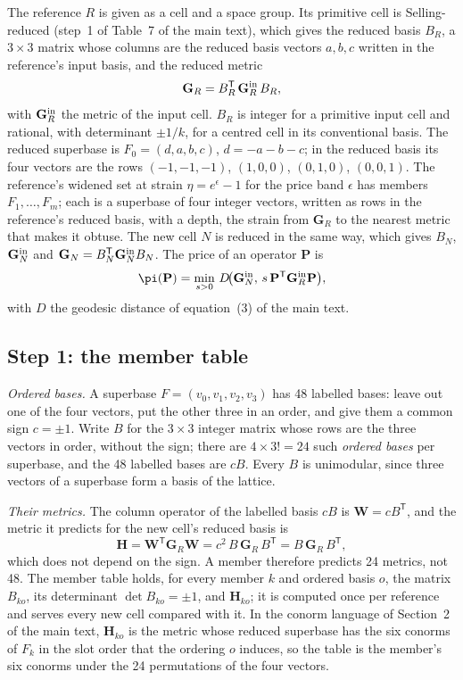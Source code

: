 \documentclass[preprint,pdf]{iucr}          %
\newcommand{\Gmet}{\mathbf{G}}
\newcommand{\Pop}{\mathbf{P}}
\newcommand{\Wop}{\mathbf{W}}
\newcommand{\dist}{D}
\begin{document}
The reference $R$ is given as a cell and a space group. Its primitive cell is Selling-reduced (step~1 of Table~7 of the main text), which gives the reduced basis $B_R$, a $3\times3$ matrix whose columns are the reduced basis vectors $a,b,c$ written in the reference's input basis, and the reduced metric
\begin{equation}
\Gmet_R=B_R^{\mathsf T}\,\Gmet_R^{\rm in}\,B_R ,
\end{equation}
with $\Gmet_R^{\rm in}$ the metric of the input cell. $B_R$ is integer for a primitive input cell and rational, with determinant $\pm1/k$, for a centred cell in its conventional basis. The reduced superbase is $F_0=(d,a,b,c)$, $d=-a-b-c$; in the reduced basis its four vectors are the rows $(-1,-1,-1)$, $(1,0,0)$, $(0,1,0)$, $(0,0,1)$. The reference's widened set at strain $\eta=e^\epsilon-1$ for the price band $\epsilon$ has members $F_1,\dots,F_m$; each is a superbase of four integer vectors, written as rows in the reference's reduced basis, with a depth, the strain from $\Gmet_R$ to the nearest metric that makes it obtuse. The new cell $N$ is reduced in the same way, which gives $B_N$, $\Gmet_N^{\rm in}$ and $\Gmet_N=B_N^{\mathsf T}\Gmet_N^{\rm in}B_N$. The price of an operator $\Pop$ is
\begin{equation}
\pi(\Pop)=\min_{s>0}\,\dist\!\bigl(\Gmet_N^{\rm in},\,s\,\Pop^{\mathsf T}\Gmet_R^{\rm in}\Pop\bigr),
\label{eq:wf-price}
\end{equation}
with $\dist$ the geodesic distance of equation~(3) of the main text.

\subsection{Step 1: the member table}

\emph{Ordered bases.} A superbase $F=(v_0,v_1,v_2,v_3)$ has 48 labelled bases: leave out one of the four vectors, put the other three in an order, and give them a common sign $c=\pm1$. Write $B$ for the $3\times3$ integer matrix whose rows are the three vectors in order, without the sign; there are $4\times3!=24$ such \emph{ordered bases} per superbase, and the 48 labelled bases are $cB$. Every $B$ is unimodular, since three vectors of a superbase form a basis of the lattice.

\emph{Their metrics.} The column operator of the labelled basis $cB$ is $\Wop=cB^{\mathsf T}$, and the metric it predicts for the new cell's reduced basis is
\begin{equation}
\mathbf H=\Wop^{\mathsf T}\Gmet_R\Wop=c^2\,B\,\Gmet_R\,B^{\mathsf T}=B\,\Gmet_R\,B^{\mathsf T},
\label{eq:wf-H}
\end{equation}
which does not depend on the sign. A member therefore predicts 24 metrics, not 48. The member table holds, for every member $k$ and ordered basis $o$, the matrix $B_{ko}$, its determinant $\det B_{ko}=\pm1$, and $\mathbf H_{ko}$; it is computed once per reference and serves every new cell compared with it. In the conorm language of Section~2 of the main text, $\mathbf H_{ko}$ is the metric whose reduced superbase has the six conorms of $F_k$ in the slot order that the ordering $o$ induces, so the table is the member's six conorms under the 24 permutations of the four vectors.
\end{document}
